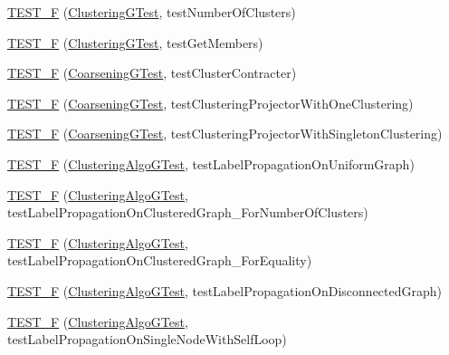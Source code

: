 \begin{DoxyCompactItemize}
\item 
\hyperlink{namespace_networ_kit_a39be1a4ee5b3b179ab6ed2bffbaf30a7}{T\-E\-S\-T\-\_\-\-F} (\hyperlink{class_networ_kit_1_1_clustering_g_test}{Clustering\-G\-Test}, test\-Number\-Of\-Clusters)
\item 
\hyperlink{namespace_networ_kit_a2782cc868005026053950db0ef91fa77}{T\-E\-S\-T\-\_\-\-F} (\hyperlink{class_networ_kit_1_1_clustering_g_test}{Clustering\-G\-Test}, test\-Get\-Members)
\item 
\hyperlink{namespace_networ_kit_af9839fafa3ea33c533ac5c910de4d716}{T\-E\-S\-T\-\_\-\-F} (\hyperlink{class_networ_kit_1_1_coarsening_g_test}{Coarsening\-G\-Test}, test\-Cluster\-Contracter)
\item 
\hyperlink{namespace_networ_kit_aaefe3f4226eaaaa054c4e13b26822edd}{T\-E\-S\-T\-\_\-\-F} (\hyperlink{class_networ_kit_1_1_coarsening_g_test}{Coarsening\-G\-Test}, test\-Clustering\-Projector\-With\-One\-Clustering)
\item 
\hyperlink{namespace_networ_kit_a0ae784520b38efeaf8ae258e06db0fbf}{T\-E\-S\-T\-\_\-\-F} (\hyperlink{class_networ_kit_1_1_coarsening_g_test}{Coarsening\-G\-Test}, test\-Clustering\-Projector\-With\-Singleton\-Clustering)
\item 
\hyperlink{namespace_networ_kit_ac88ca919fafae77b31d9701fe3fbf41f}{T\-E\-S\-T\-\_\-\-F} (\hyperlink{class_networ_kit_1_1_clustering_algo_g_test}{Clustering\-Algo\-G\-Test}, test\-Label\-Propagation\-On\-Uniform\-Graph)
\item 
\hyperlink{namespace_networ_kit_a7590ba53b3c7daa9d805db41b17d979e}{T\-E\-S\-T\-\_\-\-F} (\hyperlink{class_networ_kit_1_1_clustering_algo_g_test}{Clustering\-Algo\-G\-Test}, test\-Label\-Propagation\-On\-Clustered\-Graph\-\_\-\-For\-Number\-Of\-Clusters)
\item 
\hyperlink{namespace_networ_kit_a47440ebf4f9b819ed49f7d43584fcafa}{T\-E\-S\-T\-\_\-\-F} (\hyperlink{class_networ_kit_1_1_clustering_algo_g_test}{Clustering\-Algo\-G\-Test}, test\-Label\-Propagation\-On\-Clustered\-Graph\-\_\-\-For\-Equality)
\item 
\hyperlink{namespace_networ_kit_a2a306d74607ec520cad796ad6603f093}{T\-E\-S\-T\-\_\-\-F} (\hyperlink{class_networ_kit_1_1_clustering_algo_g_test}{Clustering\-Algo\-G\-Test}, test\-Label\-Propagation\-On\-Disconnected\-Graph)
\item 
\hyperlink{namespace_networ_kit_ab4a7126555e635ad80bb0f05a587b237}{T\-E\-S\-T\-\_\-\-F} (\hyperlink{class_networ_kit_1_1_clustering_algo_g_test}{Clustering\-Algo\-G\-Test}, test\-Label\-Propagation\-On\-Single\-Node\-With\-Self\-Loop)

\end{DoxyCompactItemize}
